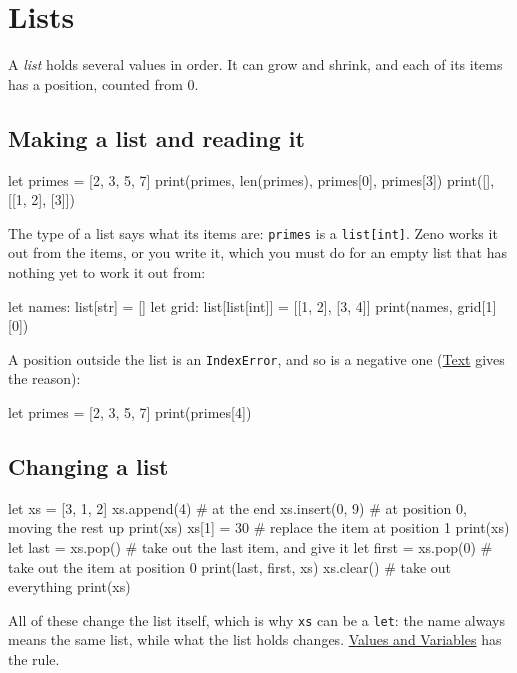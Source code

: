 \chapter{Lists}\label{ch-lists}

A \emph{list} holds several values in order. It can grow and shrink,
and each of its items has a position, counted from 0.

\section{Making a list and reading it}

\begin{zeno}
let primes = [2, 3, 5, 7]
print(primes, len(primes), primes[0], primes[3])
print([], [[1, 2], [3]])
\end{zeno}

The type of a list says what its items are: \verb|primes| is a
\verb|list[int]|. Zeno works it out from the items, or you write it,
which you must do for an empty list that has nothing yet to work it
out from:

\begin{zeno}
let names: list[str] = []
let grid: list[list[int]] = [[1, 2], [3, 4]]
print(names, grid[1][0])
\end{zeno}

A position outside the list is an \verb|IndexError|, and so is a
negative one (\hyperref[ch-text]{Text} gives the reason):

\begin{zeno}[fails=yes]
let primes = [2, 3, 5, 7]
print(primes[4])
\end{zeno}

\section{Changing a list}

\begin{zeno}
let xs = [3, 1, 2]
xs.append(4)           # at the end
xs.insert(0, 9)        # at position 0, moving the rest up
print(xs)
xs[1] = 30             # replace the item at position 1
print(xs)
let last = xs.pop()    # take out the last item, and give it
let first = xs.pop(0)  # take out the item at position 0
print(last, first, xs)
xs.clear()             # take out everything
print(xs)
\end{zeno}

All of these change the list itself, which is why \verb|xs| can be a
\verb|let|: the name always means the same list, while what the list
holds changes. \hyperref[ch-values]{Values and Variables} has the rule.

